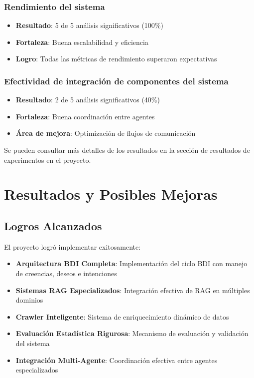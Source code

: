\documentclass[runningheads,a4paper]{llncs}
\begin{document}
\subsubsection{Rendimiento del sistema}
\begin{itemize}
    \item \textbf{Resultado}: 5 de 5 análisis significativos (100\%)
    \item \textbf{Fortaleza}: Buena escalabilidad y eficiencia
    \item \textbf{Logro}: Todas las métricas de rendimiento superaron expectativas
\end{itemize}

\subsubsection{Efectividad de integración de componentes del sistema}
\begin{itemize}
    \item \textbf{Resultado}: 2 de 5 análisis significativos (40\%)
    \item \textbf{Fortaleza}: Buena coordinación entre agentes
    \item \textbf{Área de mejora}: Optimización de flujos de comunicación
\end{itemize}

Se pueden consultar más detalles de los resultados en la sección de resultados de experimentos en el proyecto.

\section{Resultados y Posibles Mejoras}

\subsection{Logros Alcanzados}

El proyecto logró implementar exitosamente:

\begin{itemize}
    \item \textbf{Arquitectura BDI Completa}: Implementación del ciclo BDI con manejo de creencias, deseos e intenciones
    \item \textbf{Sistemas RAG Especializados}: Integración efectiva de RAG en múltiples dominios
    \item \textbf{Crawler Inteligente}: Sistema de enriquecimiento dinámico de datos
    \item \textbf{Evaluación Estadística Rigurosa}: Mecanismo de evaluación y validación del sistema
    \item \textbf{Integración Multi-Agente}: Coordinación efectiva entre agentes especializados
\end{itemize}
\end{document}
